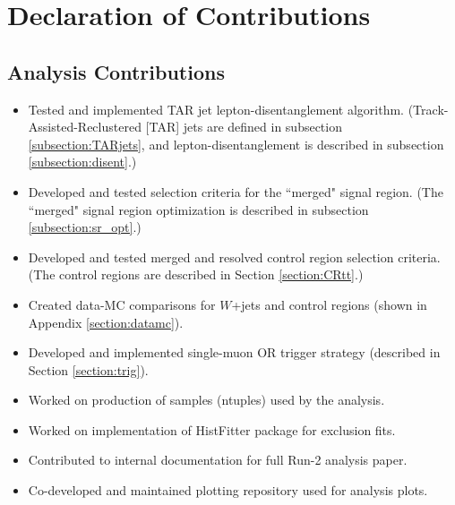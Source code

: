 \newpage
{}

\chapter*{Declaration of Contributions}
\section*{Analysis Contributions}
\begin{itemize}
\item Tested and implemented TAR jet lepton-disentanglement algorithm. (Track-Assisted-Reclustered [TAR] jets are defined in subsection \ref{subsection:TARjets}, and lepton-disentanglement is described in subsection \ref{subsection:disent}.)
\item Developed and tested selection criteria for the ``merged" signal region. (The ``merged" signal region optimization is described in subsection \ref{subsection:sr_opt}.)
\item Developed and tested merged and resolved \ttbar control region selection criteria. (The \ttbar control regions are described in Section \ref{section:CRtt}.)
\item Created data-MC comparisons for $W$+jets and \ttbar control regions (shown in Appendix \ref{section:datamc}).
\item Developed and implemented single-muon OR \met trigger strategy (described in Section \ref{section:trig}).
\item Worked on production of samples (ntuples) used by the analysis.
\item Worked on implementation of HistFitter package for exclusion fits.
\item Contributed to internal documentation for full Run-2 analysis paper.
\item Co-developed and maintained plotting repository used for analysis plots.
\end{itemize}
